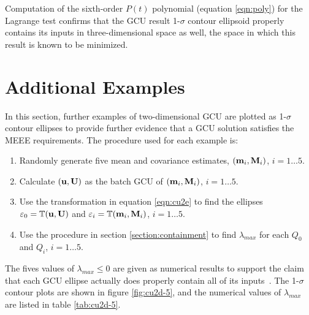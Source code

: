 Computation of the sixth-order $P(t)$ polynomial (equation \ref{eqn:poly}) for the Lagrange test confirms that the GCU
result 1-$\sigma$ contour ellipsoid properly contains its inputs in three-dimensional space as well, the space in which
this result is known to be minimized.


\section{Additional Examples}\label{section:examples}

In this section, further examples of two-dimensional GCU are plotted as 1-$\sigma$ contour ellipses to provide further
evidence that a GCU solution satisfies the MEEE requirements. The procedure used for each example is:
\begin{enumerate}
    \item Randomly generate five mean and covariance estimates, $(\mathbf{m}_i,\mathbf{M}_i)$, $i=1\dots 5$.
    \item Calculate $(\mathbf{u},\mathbf{U})$ as the batch GCU of $(\mathbf{m}_i,\mathbf{M}_i)$, $i=1\dots 5$.
    \item Use the transformation in equation \ref{eqn:cu2e} to find the ellipses $\varepsilon_0=\mathbb{T}(\mathbf{u},\mathbf{U})$
        and $\varepsilon_i=\mathbb{T}(\mathbf{m}_i,\mathbf{M}_i)$, $i=1\dots 5$.
    \item Use the procedure in section \ref{section:containment} to find $\lambda_{max}$ for each $Q_0$ and $Q_i$,
        $i=1\dots 5$.
\end{enumerate}
The fives values of $\lambda_{max}\leq 0$ are given as numerical results to support the claim that each GCU ellipse
actually does properly contain all of its inputs~\cite{eberly00}. The 1-$\sigma$ contour plots are shown in figure
\ref{fig:cu2d-5}, and the numerical values of $\lambda_{max}$ are listed in table \ref{tab:cu2d-5}.


